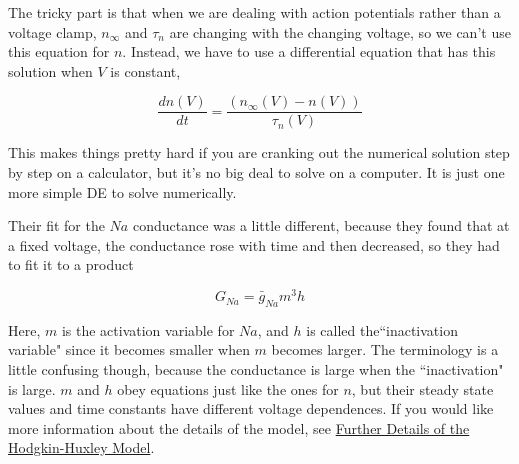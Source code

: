 \documentclass[12pt]{article}
\begin{document}
The tricky part is that when we are dealing with action potentials rather than a voltage clamp, $n_\infty$ and $\tau_n$ are changing with the changing voltage, so we can't use this equation for $n$. Instead, we have to use a differential equation that has this solution when $V$ is constant,

\begin{equation}
		\frac{dn(V)}{dt} = \frac{(n_\infty(V) - n(V))}{\tau_n(V)}
\label{eq:eq4}	
\end{equation}

This makes things pretty hard if you are cranking out the numerical solution step by step on a calculator, but it's no big deal to solve on a computer. It is just one more simple DE to solve numerically.

Their fit for the $Na$ conductance was a little different, because they found that at a fixed voltage, the conductance rose with time and then decreased, so they had to fit it to a product

\begin{equation}
		G_{Na} = \bar{g}_{Na}m^{3}h
\label{eq:eq5}		
\end{equation}

Here, $m$ is the activation variable for $Na$, and $h$ is called the``inactivation variable" since it becomes smaller when $m$ becomes larger. The terminology is a little confusing though, because the conductance is large when the ``inactivation" is large. $m$ and $h$ obey equations just like the ones for $n$, but their steady state values and time constants have different voltage dependences. If you would like more information about the details of the model, see \href{../hh-model-details/hh-model-details.pdf}{Further Details of the Hodgkin-Huxley Model}.
\end{document}
